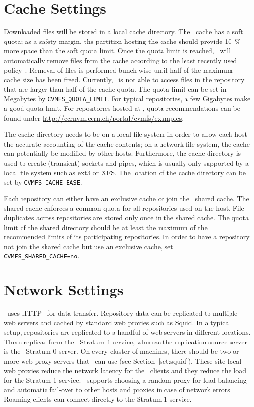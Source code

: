 \section{Cache Settings}
\label{sct:config:cache}
Downloaded files will be stored in a local cache directory.
The \cvmfs\ cache has a soft quota; as a safety margin, the partition hosting the cache should provide \SI{10}{\percent} more space than the soft quota limit.
Once the quota limit is reached, \cvmfs\ will automatically remove files from the cache according to the least recently used policy~\cite{lru06}.
Removal of files is performed bunch-wise until half of the maximum cache size has been freed.
Currently, \cvmfs\ is not able to access files in the repository that are larger than half of the cache quota.
The quota limit can be set in Megabytes by \texttt{CVMFS\_QUOTA\_LIMIT}.
For typical repositories, a few Gigabytes make a good quota limit.
For repositories hosted at \cern, quota recommendations can be found under \url{http://cernvm.cern.ch/portal/cvmfs/examples}.

The cache directory needs to be on a local file system in order to allow each host the accurate accounting of the cache contents; on a network file system, the cache can potentially be modified by other hosts.
Furthermore, the cache directory is used to create (transient) sockets and pipes, which is usually only supported by a local file system such as ext3 or XFS.
The location of the cache directory can be set by \texttt{CVMFS\_CACHE\_BASE}.

Each repository can either have an exclusive cache or join the \cvmfs\ shared cache.
The shared cache enforces a common quota for all repositories used on the host.
File duplicates across repositories are stored only once in the shared cache.
The quota limit of the shared directory should be at least the maximum of the recommended limits of its participating repositories.
In order to have a repository not join the shared cache but use an exclusive cache, set \texttt{CVMFS\_SHARED\_CACHE=no}.

\section{Network Settings}
\label{sct:config:network}
\cvmfs\ uses HTTP~\cite{rfc1945,rfc2616} for data transfer.
Repository data can be replicated to multiple web servers and cached by standard web proxies such as Squid.
In a typical setup, repositories are replicated to a handful of web servers in different locations.
These replicas form the \cvmfs\ Stratum 1 service, whereas the replication source server is the \cvmfs\ Stratum 0 server.
On every cluster of machines, there should be two or more web proxy servers that \cvmfs\ can use (see Section~\ref{sct:squid}).
These site-local web proxies reduce the network latency for the \cvmfs\ clients and they reduce the load for the Stratum 1 service.
\cvmfs\ supports choosing a random proxy for load-balancing and automatic fail-over to other hosts and proxies in case of network errors.
Roaming clients can connect directly to the Stratum 1 service.


